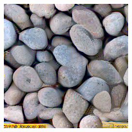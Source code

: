 \begin{figure}[]
\begin{subfigure}{\textwidth}
\begin{subfigure}{0.24\textwidth}
            \caption*{}
        \end{subfigure}
        \hfill
        \begin{subfigure}{0.24\textwidth}
            \centering
            \includegraphics[width=\textwidth]{images/04-experiment01/pebbles/1000/white_proj.jpg}
            \caption*{}
        \end{subfigure}


\end{subfigure}
\end{figure}
